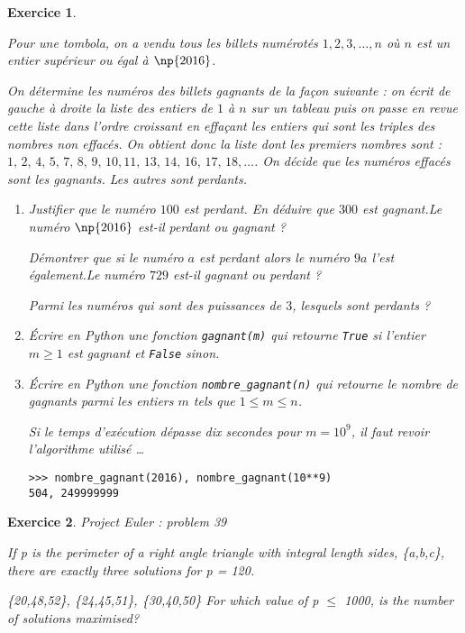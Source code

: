 \documentclass[a4paper,10pt]{article}
\newtheorem{exo}{\sc Exercice}
{\theorembodyfont{\rmfamily}\newtheorem{exo-f}{\sc Exercice}}
\renewcommand{\[}{[\![}
\renewcommand{\]}{]\!]}
\renewcommand{\=}{\mathop{=}\limits}
\begin{document}
\begin{exo} \label{tombola}

Pour une tombola, on a vendu tous les billets numérotés $1, 2, 3, \ldots , n$ où $n$ est un entier supérieur ou égal à $\np{2016}$.

On détermine les numéros des billets gagnants de la façon suivante : on écrit de gauche à droite la liste des entiers
de $1$ à $n$ sur un tableau puis on passe en revue cette liste dans l'ordre croissant en effaçant les entiers qui sont les triples des nombres non effacés. On obtient donc la liste dont les premiers nombres sont :
$
1, \, 2, \, 4,  \, 5,\, 7,\, 8,\, 9, \,10, 11, \,13, \,14, \,16, \,17, \,18, \ldots
$.
On décide que les numéros effacés sont les gagnants. Les autres sont perdants.
\begin{enumerate}
\item Justifier que le numéro $100$ est perdant. En déduire que $300$ est gagnant.Le numéro $\np{2016}$ est-il perdant ou gagnant ?

Démontrer que si le numéro $a$ est perdant alors le numéro $9a$ l'est également.Le numéro $729$ est-il gagnant ou perdant ?

Parmi les numéros qui sont des puissances de $3$, lesquels sont perdants ?

\item  Écrire en Python une fonction \verb+gagnant(m)+ qui retourne \verb+True+ si l'entier $m\geqslant 1$ est gagnant et \verb+False+ sinon. 

\item Écrire en Python une fonction \verb+nombre_gagnant(n)+ qui retourne le nombre de gagnants parmi les entiers $m$ tels que $1 \leqslant m \leqslant n$.

Si le temps d'exécution dépasse dix secondes pour $m = 10^{9}$, il faut revoir l'algorithme utilisé \ldots

\begin{verbatim}
>>> nombre_gagnant(2016), nombre_gagnant(10**9)
504, 249999999
\end{verbatim}

\end{enumerate}

\end{exo}

\begin{exo} \label{projetEuler39} \emph{Project Euler : problem 39} 

If p is the perimeter of a right angle triangle with integral length sides, \{a,b,c\}, there are exactly three solutions for p = 120.

\{20,48,52\}, \{24,45,51\}, \{30,40,50\} For which value of p $\leqslant$ 1000, is the number of solutions maximised?

\end{exo}
\end{document}
